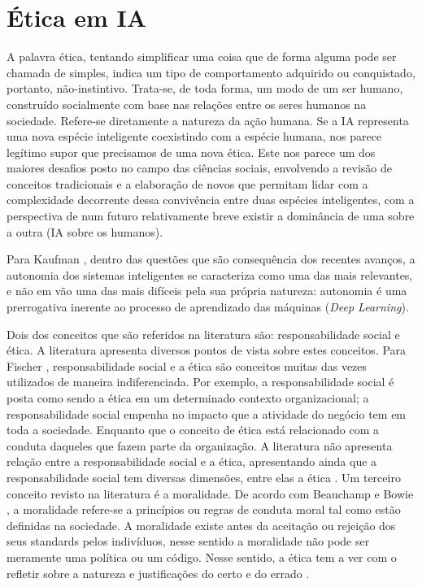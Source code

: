 \section{Ética em IA}

A palavra ética, tentando simplificar uma coisa que de forma alguma pode ser chamada de simples, indica um tipo de comportamento adquirido ou conquistado, portanto, não-instintivo. Trata-se, de toda forma, um modo de um ser humano, construído socialmente com base nas relações entre os seres humanos na sociedade. Refere-se diretamente a natureza da ação humana. Se a IA representa uma nova espécie inteligente coexistindo com a espécie humana, nos parece legítimo supor que precisamos de uma nova ética. Este nos parece um dos maiores desafios posto no campo das ciências sociais, envolvendo a revisão de conceitos tradicionais e a elaboração de novos que permitam lidar com a complexidade decorrente dessa convivência entre duas espécies inteligentes, com a perspectiva de num futuro relativamente breve existir a dominância de uma sobre a outra (IA sobre os humanos)\cite{kaufman}.

Para Kaufman \cite{kaufman}, dentro das questões que são consequência dos recentes avanços, a autonomia dos sistemas inteligentes se caracteriza como uma das mais relevantes, e não em vão uma das mais difíceis pela sua própria natureza: autonomia é uma prerrogativa inerente ao processo de aprendizado das máquinas (\textit{Deep Learning}).

Dois dos conceitos que são referidos na literatura são: responsabilidade social e ética. A literatura apresenta diversos pontos de vista sobre estes conceitos. Para Fischer \cite{socialresponsability}, responsabilidade social e a ética são conceitos muitas das vezes utilizados de maneira indiferenciada. Por exemplo, a responsabilidade social é posta como sendo a ética em um determinado contexto organizacional; a responsabilidade social empenha no impacto que a atividade do negócio tem em toda a sociedade. Enquanto que o conceito de ética está relacionado com a conduta daqueles que fazem parte da organização. A literatura não apresenta relação entre a responsabilidade social e a ética, apresentando ainda que a responsabilidade social tem diversas dimensões, entre elas a ética \cite{socialresponsability}. Um terceiro conceito revisto na literatura é a moralidade. De acordo com Beauchamp e Bowie \cite{ethicaltheory}, a moralidade refere-se a princípios ou regras de conduta moral tal como estão definidas na sociedade. A moralidade existe antes da aceitação ou rejeição dos seus standards pelos indivíduos, nesse sentido a moralidade não pode ser meramente uma política ou um código. Nesse sentido, a ética tem a ver com o refletir sobre a natureza e justificações do certo e do errado \cite{ethicaltheory}.

